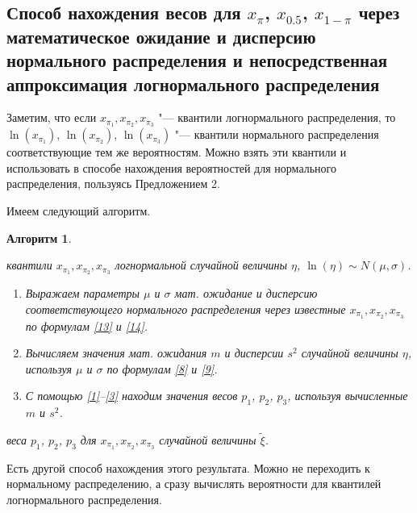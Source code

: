 \documentclass[12pt]{article}
\newtheorem{alg}{Алгоритм}
\newenvironment{pr1}{\par\noindent{\bf Дано:}}{}
\newenvironment{pr2}{\par\noindent{\bf Шаги:}}{}
\newenvironment{pr3}{\par\noindent{\bf Результат:}}{}
\begin{document}
	\subsection{Способ нахождения весов для $x_{\pi}$, $x_{0.5}$, $x_{1-\pi}$ через математическое ожидание и дисперсию нормального распределения и непосредственная аппроксимация логнормального распределения}
	Заметим, что если
	$x_{\pi_{1}}, x_{\pi_{2}}, x_{\pi_{3}}$ "--- квантили логнормального распределения, то $\ln(x_{\pi_{1}})$, $\ln(x_{\pi_{2}})$, $\ln(x_{\pi_{3}})$ "--- квантили нормального распределения соответствующие тем же вероятностям. Можно взять эти квантили и использовать в способе нахождения вероятностей для нормального распределения, пользуясь Предложением 2.
	
	Имеем следующий алгоритм.
	
	\begin{alg}\label{al1}
		\begin{pr1}
			квантили $x_{\pi_{1}}, x_{\pi_{2}}, x_{\pi_{3}}$ логнормальной случайной величины $\eta$, $\ln(\eta) \sim N(\mu, \sigma)$.
		\end{pr1}
		
		\begin{pr2}\end{pr2}
		\begin{enumerate}
			
			\item Выражаем параметры $\mu$ и $\sigma$ мат. ожидание и дисперсию соответствующего нормального распределения через известные $x_{\pi_{1}}, x_{\pi_{2}}, x_{\pi_{3}}$ по формулам \eqref{13} и \eqref{14}. 
			\item Вычисляем значения мат. ожидания $m$ и дисперсии $s^{2}$ случайной величины $\eta$, используя $\mu$ и $\sigma$ по формулам \eqref{8} и \eqref{9}.
			\item С помощью \eqref{1}--\eqref{3} находим значения весов $p_{1}$, $p_{2}$, $p_{3}$, используя вычисленные $m$ и $s^{2}$.
		\end{enumerate}
		\begin{pr3}\end{pr3} веса $p_{1}$, $p_{2}$, $p_{3}$ для $x_{\pi_{1}}, x_{\pi_{2}}, x_{\pi_{3}}$ случайной величины $\tilde{\xi}$.
		
	\end{alg}
	
	Есть другой способ нахождения этого результата. Можно не переходить к нормальному распределению, а сразу вычислять вероятности для квантилей логнормального распределения.
	
\end{document}

